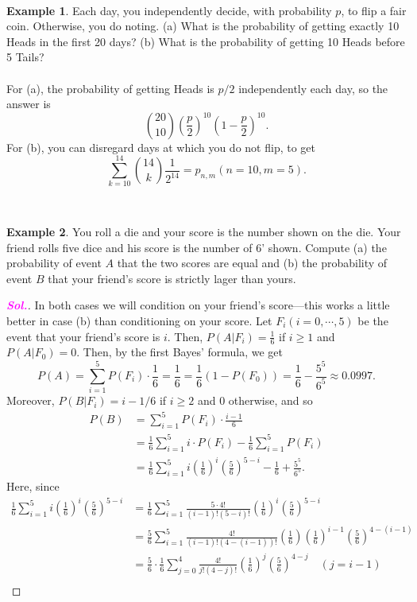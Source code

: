\documentclass[12pt,a4paper]{article}
\theoremstyle{definition}
\newtheorem{example}{Example}[section]
\theoremstyle{definition}
\theoremstyle{definition}
\theoremstyle{definition}
\theoremstyle{remark}
\theoremstyle{definition}
\newcommand{\sol}{\textcolor{magenta}{\bf \textit{Sol.}}\quad}
\begin{document}
\
\begin{example}
	Each day, you independently decide, with probability $p$, to flip a fair coin. Otherwise, you do noting. (a) What is the probability of getting exactly 10 Heads in the first 20 days? (b) What is the probability of getting 10 Heads before 5 Tails?\\
	\\
	For (a), the probability of getting Heads is $p/2$ independently each day, so the answer is \[
	\binom{20}{10}\left(\frac{p}{2}\right)^{10}\left(1-\frac{p}{2}\right)^10.
	\] For (b), you can disregard days at which you do not flip, to get \[
	\sum_{k=10}^{14}\binom{14}{k}\frac{1}{2^{14}}=p_{n,m}(n=10, m=5).
	\]
\end{example}
\
\begin{example}
	You roll a die and your score is the number shown on the die. Your friend rolls five dice and his score is the number of 6' shown. Compute (a) the probability of event $A$ that the two scores are equal and (b) the probability of event $B$ that your friend's score is strictly lager than yours.\begin{proof}[\sol]
		In both cases we will condition on your friend's score---this works a little better in case (b) than conditioning on your score. Let $F_i (i=0,\cdots,5)$ be the event that your friend's score is $i$. Then, $P(A|F_i)=\frac{1}{6}$ if $i\geq 1$ and $P(A|F_0)=0$. Then, by the first Bayes' formula, we get \[
		P(A)=\sum_{i=1}^{5}P(F_i)\cdot\frac{1}{6}=\frac{1}{6}=\frac{1}{6}(1-P(F_0))=\frac{1}{6}-\frac{5^5}{6^5}\approx0.0997.
		\] Moreover, $P(B|F_i)=i-1/6$ if $i\geq 2$ and $0$ otherwise, and so \begin{align*}
		P(B)&=\sum_{i=1}^{5}P(F_i)\cdot\frac{i-1}{6}\\
		&=\frac{1}{6}\sum_{i=1}^{5}i\cdot P(F_i)-\frac{1}{6}\sum_{i=1}^{5}P(F_i)\\
		&=\frac{1}{6}\sum_{i=1}^{5}i\left(\frac{1}{6}\right)^i\left(\frac{5}{6}\right)^{5-i}-\frac{1}{6}+\frac{5^5}{6^5}.
		\end{align*} Here, since \begin{align*}
		\frac{1}{6}\sum_{i=1}^{5}i\left(\frac{1}{6}\right)^i\left(\frac{5}{6}\right)^{5-i}&=\frac{1}{6}\sum_{i=1}^{5}\frac{5\cdot 4!}{(i-1)!(5-i)!}\left(\frac{1}{6}\right)^i\left(\frac{5}{6}\right)^{5-i}\\
		&=\frac{5}{6}\sum_{i=1}^{5}\frac{4!}{(i-1)!(4-(i-1))!}\left(\frac{1}{6}\right)\left(\frac{1}{6}\right)^{i-1}\left(\frac{5}{6}\right)^{4-(i-1)}\\
		&=\frac{5}{6}\cdot\frac{1}{6}\sum_{j=0}^{4}\frac{4!}{j!(4-j)!}\left(\frac{1}{6}\right)^j\left(\frac{5}{6}\right)^{4-j}\quad(j=i-1)\\

\end{align*}
\end{proof}
\end{example}
\end{document}
